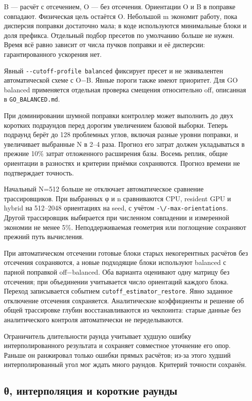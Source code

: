 B --- расчёт с отсечением, O --- без отсечения. Ориентации O и B в
поправке совпадают. Физическая цель остаётся O. Небольшой m экономит
работу, пока дисперсия поправки достаточно мала; в коде используются
минимальные блоки и доля префикса. Отдельный подбор пресетов по
умолчанию больше не нужен. Время всё равно зависит от числа пучков
поправки и её дисперсии: гарантированного ускорения нет.

Явный \texttt{-\/-cutoff-profile\ balanced} фиксирует пресет и не
эквивалентен автоматической схеме с O−B. Явные пороги также имеют
приоритет. Для GO balanced применяется отдельная проверка смещения
относительно off, описанная в \nolinkurl{GO_BALANCED.md}.

При доминировании шумной поправки контроллер может выполнить до двух
коротких подраундов перед дорогим увеличением базовой выборки. Теперь
подраунд берёт до 128 проблемных углов, включая разные уровни поправки,
и увеличивает выбранные N в 2--4 раза. Прогноз его затрат должен
укладываться в прежние 10\% затрат отложенного расширения базы. Восемь
реплик, общие ориентации в разностях и критерии приёмки сохраняются.
Прогноз времени не подтверждает точность.

Начальный N=512 больше не отключает автоматическое сравнение
трассировщиков. При выбранных φ и n сравниваются CPU, resident GPU и
hybrid на 512--2048 ориентациях на seed, с учётом
\nolinkurl{-\/-max-orientations}. Другой трассировщик выбирается при
численном совпадении и измеренной экономии не менее 5\%.
Неподдерживаемая геометрия или поглощение сохраняют прежний путь
вычисления.

При автоматическом отсечении готовые блоки старых некогерентных расчётов
без отсечения сохраняются, а новые подходящие блоки используют balanced
с парной поправкой off−balanced. Оба варианта оценивают одну матрицу без
отсечения; при объединении учитывается число ориентаций каждого блока.
Переход записывается событием \nolinkurl{cutoff_estimator_restore}. Явно
заданное отключение отсечения сохраняется. Аналитические коэффициенты и
решение об общей трассировке глубин восстанавливаются из чекпоинта:
старые данные без аналитического контроля автоматически не
переделываются.

Ограничитель длительности раунда учитывает худшую ошибку
интерполированного результата и сохраняет совместное уточнение его опор.
Раньше он ранжировал только ошибки прямых расчётов; из-за этого худший
интерполированный угол мог ждать много раундов. Критерий точности
сохранён.

\subsection{θ, интерполяция и короткие
раунды}\label{ux3b8-ux438ux43dux442ux435ux440ux43fux43eux43bux44fux446ux438ux44f-ux438-ux43aux43eux440ux43eux442ux43aux438ux435-ux440ux430ux443ux43dux434ux44b}


